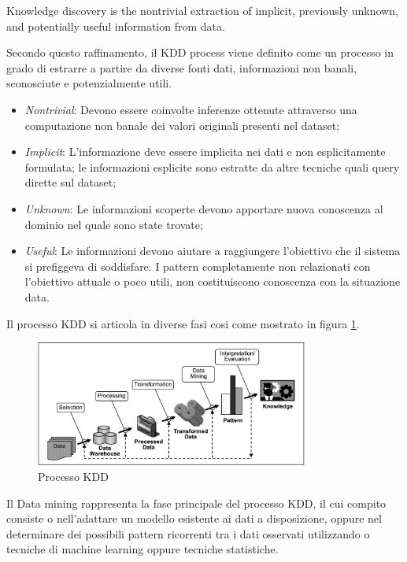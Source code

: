 \begin{mydef}
	Knowledge discovery is the nontrivial extraction of implicit, previously unknown, and potentially useful information from data.\cite{citeulike:1550195} 
\end{mydef} 
Secondo questo raffinamento, il KDD process viene definito come un processo in grado di estrarre a partire da diverse fonti dati, informazioni non banali, sconosciute e potenzialmente utili. 
\begin{itemize}
	\item \emph{Nontrivial}: Devono essere coinvolte inferenze ottenute attraverso una computazione non banale dei valori originali presenti nel dataset;
	\item \emph{Implicit}: L'informazione deve essere implicita nei dati e non esplicitamente formulata; le informazioni esplicite sono estratte da altre tecniche quali query dirette sul dataset;
	\item \emph{Unknown}: Le informazioni scoperte devono apportare nuova conoscenza al dominio nel quale sono state trovate;
	\item \emph{Useful}: Le informazioni devono aiutare a raggiungere l'obiettivo che il sistema si prefiggeva di soddisfare. I pattern completamente non relazionati con l'obiettivo attuale o poco utili, non costituiscono conoscenza con la situazione data.
\end{itemize}
Il processo KDD si articola in diverse fasi cosi come mostrato in figura \ref{kddprocess}.
\begin{figure}[hbtp]
\centering
\includegraphics[width=0.8\textwidth]{./images/kddprocess.png}
\caption{Processo KDD}
\label{kddprocess}
\end{figure}
Il Data mining rappresenta la fase principale del processo KDD, il cui compito consiste o nell'adattare un modello esistente ai dati a disposizione, oppure nel determinare dei possibili pattern ricorrenti tra i dati osservati utilizzando o tecniche di machine learning oppure tecniche statistiche. 

